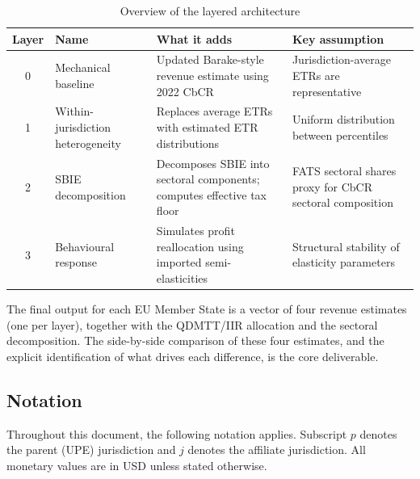 \documentclass[11pt,a4paper]{article}
\begin{document}
\begin{table}[H]
\centering
\caption{Overview of the layered architecture}
\label{tab:layers}
\small
\begin{tabular}{@{}clp{5.5cm}p{4.5cm}@{}}
\toprule
Layer & Name & What it adds & Key assumption \\
\midrule
0 & Mechanical baseline & Updated Barake-style revenue estimate using 2022 CbCR & Jurisdiction-average ETRs are representative \\
1 & Within-jurisdiction heterogeneity & Replaces average ETRs with estimated ETR distributions & Uniform distribution between percentiles \\
2 & SBIE decomposition & Decomposes SBIE into sectoral components; computes effective tax floor & FATS sectoral shares proxy for CbCR sectoral composition \\
3 & Behavioural response & Simulates profit reallocation using imported semi-elasticities & Structural stability of elasticity parameters \\
\bottomrule
\end{tabular}
\end{table}

The final output for each EU Member State is a vector of four revenue estimates (one per layer), together with the QDMTT/IIR allocation and the sectoral decomposition. The side-by-side comparison of these four estimates, and the explicit identification of what drives each difference, is the core deliverable.

\subsection{Notation}\label{sec:notation}

Throughout this document, the following notation applies. Subscript $p$ denotes the parent (UPE) jurisdiction and $j$ denotes the affiliate jurisdiction. All monetary values are in USD unless stated otherwise.
\end{document}
